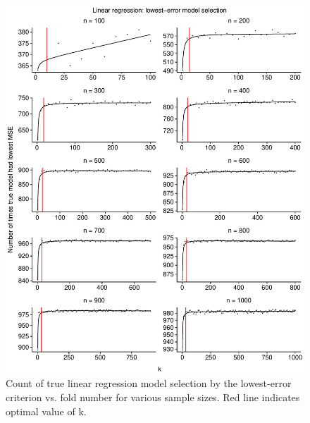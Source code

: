 \documentclass[
  12pt,
]{article}
\begin{document}
\begin{figure}[H]

{\centering \includegraphics{manuscript_files/figure-latex/unnamed-chunk-7-1} 

}

\caption{Count of true linear regression model selection by the lowest-error criterion vs. fold number for various sample sizes. Red line indicates optimal value of k.}\label{fig:unnamed-chunk-7}
\end{figure}
\end{document}
